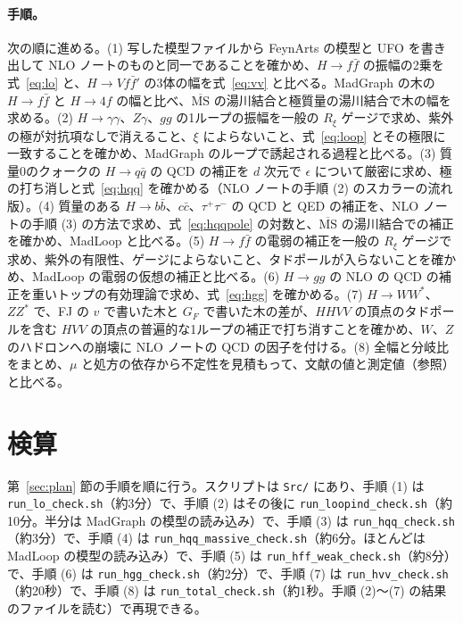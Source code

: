 \documentclass[a4paper,10pt]{ltjsarticle}
\newcommand{\MSbar}{\overline{\mathrm{MS}}}
\begin{document}
\paragraph{手順。}次の順に進める。(1) 写した模型ファイルから FeynArts の模型と UFO を書き出して NLO ノートのものと同一であることを確かめ、$H\to f\bar f$ の振幅の2乗を式~\eqref{eq:lo} と、$H\to Vf\bar f'$ の3体の幅を式~\eqref{eq:vv} と比べる。MadGraph の木の $H\to f\bar f$ と $H\to4f$ の幅と比べ、$\MSbar$ の湯川結合と極質量の湯川結合で木の幅を求める。(2) $H\to\gamma\gamma$、$Z\gamma$、$gg$ の1ループの振幅を一般の $R_\xi$ ゲージで求め、紫外の極が対抗項なしで消えること、$\xi$ によらないこと、式~\eqref{eq:loop} とその極限に一致することを確かめ、MadGraph のループで誘起される過程と比べる。(3) 質量0のクォークの $H\to q\bar q$ の QCD の補正を $d$ 次元で $\epsilon$ について厳密に求め、極の打ち消しと式~\eqref{eq:hqq} を確かめる（NLO ノートの手順 (2) のスカラーの流れ版）。(4) 質量のある $H\to b\bar b$、$c\bar c$、$\tau^+\tau^-$ の QCD と QED の補正を、NLO ノートの手順 (3) の方法で求め、式~\eqref{eq:hqqpole} の対数と、$\MSbar$ の湯川結合での補正を確かめ、MadLoop と比べる。(5) $H\to f\bar f$ の電弱の補正を一般の $R_\xi$ ゲージで求め、紫外の有限性、ゲージによらないこと、タドポールが入らないことを確かめ、MadLoop の電弱の仮想の補正と比べる。(6) $H\to gg$ の NLO の QCD の補正を重いトップの有効理論で求め、式~\eqref{eq:hgg} を確かめる。(7) $H\to WW^*$、$ZZ^*$ で、FJ の $v$ で書いた木と $G_F$ で書いた木の差が、$HHVV$ の頂点のタドポールを含む $HVV$ の頂点の普遍的な1ループの補正で打ち消すことを確かめ、$W$、$Z$ のハドロンへの崩壊に NLO ノートの QCD の因子を付ける。(8) 全幅と分岐比をまとめ、$\mu$ と処方の依存から不定性を見積もって、文献の値と測定値（参照）と比べる。

\section{検算}\label{sec:checks}

第~\ref{sec:plan} 節の手順を順に行う。スクリプトは \texttt{Src/} にあり、手順 (1) は \texttt{run\_lo\_check.sh}（約3分）で、手順 (2) はその後に \texttt{run\_loopind\_check.sh}（約10分。半分は MadGraph の模型の読み込み）で、手順 (3) は \texttt{run\_hqq\_check.sh}（約3分）で、手順 (4) は \texttt{run\_hqq\_massive\_check.sh}（約6分。ほとんどは MadLoop の模型の読み込み）で、手順 (5) は \texttt{run\_hff\_weak\_check.sh}（約8分）で、手順 (6) は \texttt{run\_hgg\_check.sh}（約2分）で、手順 (7) は \texttt{run\_hvv\_check.sh}（約20秒）で、手順 (8) は \texttt{run\_total\_check.sh}（約1秒。手順 (2)〜(7) の結果のファイルを読む）で再現できる。
\end{document}
